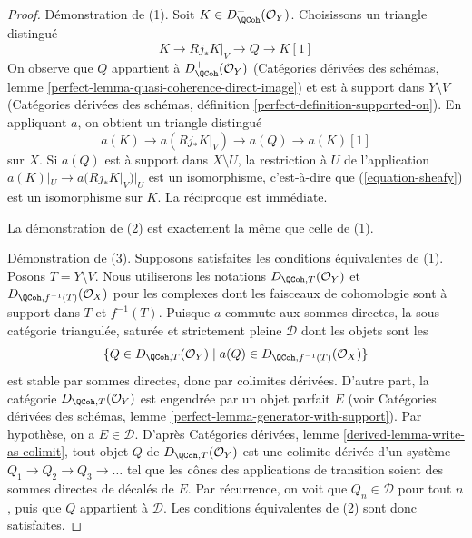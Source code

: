 \begin{proof}
Démonstration de (1). Soit $K \in D_\QCoh^+(\mathcal{O}_Y)$. Choisissons un triangle distingué
$$
K \to Rj_*K|_V \to Q \to K[1]
$$
On observe que $Q$ appartient à $D_\QCoh^+(\mathcal{O}_Y)$ (Catégories dérivées des schémas, lemme \ref{perfect-lemma-quasi-coherence-direct-image}) et est à support dans $Y \setminus V$ (Catégories dérivées des schémas, définition \ref{perfect-definition-supported-on}). En appliquant $a$, on obtient un triangle distingué
$$
a(K) \to a(Rj_*K|_V) \to a(Q) \to a(K)[1]
$$
sur $X$. Si $a(Q)$ est à support dans $X \setminus U$, la restriction à $U$ de l'application $a(K)|_U \to a(Rj_*K|_V)|_U$ est un isomorphisme, c'est-à-dire que (\ref{equation-sheafy}) est un isomorphisme sur $K$. La réciproque est immédiate.

\medskip\noindent
La démonstration de (2) est exactement la même que celle de (1).

\medskip\noindent
Démonstration de (3). Supposons satisfaites les conditions équivalentes de (1). Posons $T = Y \setminus V$. Nous utiliserons les notations $D_{\QCoh, T}(\mathcal{O}_Y)$ et $D_{\QCoh, f^{-1}(T)}(\mathcal{O}_X)$ pour les complexes dont les faisceaux de cohomologie sont à support dans $T$ et $f^{-1}(T)$. Puisque $a$ commute aux sommes directes, la sous-catégorie triangulée, saturée et strictement pleine $\mathcal{D}$ dont les objets sont les
$$
\{Q \in D_{\QCoh, T}(\mathcal{O}_Y) \mid
a(Q) \in D_{\QCoh, f^{-1}(T)}(\mathcal{O}_X)\}
$$
est stable par sommes directes, donc par colimites dérivées. D'autre part, la catégorie $D_{\QCoh, T}(\mathcal{O}_Y)$ est engendrée par un objet parfait $E$ (voir Catégories dérivées des schémas, lemme \ref{perfect-lemma-generator-with-support}). Par hypothèse, on a $E \in \mathcal{D}$. D'après Catégories dérivées, lemme \ref{derived-lemma-write-as-colimit}, tout objet $Q$ de $D_{\QCoh, T}(\mathcal{O}_Y)$ est une colimite dérivée d'un système $Q_1 \to Q_2 \to Q_3 \to \ldots$ tel que les cônes des applications de transition soient des sommes directes de décalés de $E$. Par récurrence, on voit que $Q_n \in \mathcal{D}$ pour tout $n$, puis que $Q$ appartient à $\mathcal{D}$. Les conditions équivalentes de (2) sont donc satisfaites.
\end{proof}


